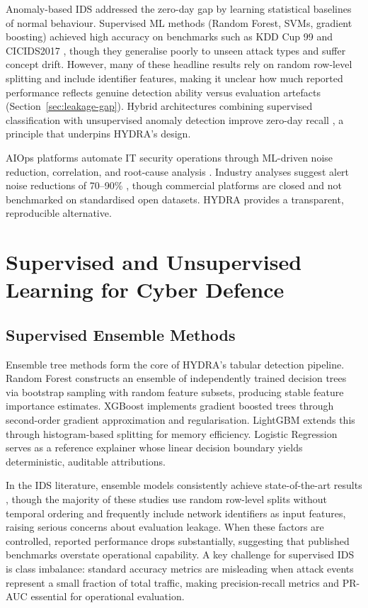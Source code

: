 \documentclass[12pt,a4paper]{report}
\begin{document}
Anomaly-based IDS addressed the zero-day gap by learning statistical baselines of normal behaviour. Supervised ML methods (Random Forest, SVMs, gradient boosting) achieved high accuracy on benchmarks such as KDD Cup 99 and CICIDS2017 \cite{aldweesh2020}, though they generalise poorly to unseen attack types and suffer concept drift. However, many of these headline results rely on random row-level splitting and include identifier features, making it unclear how much reported performance reflects genuine detection ability versus evaluation artefacts (Section~\ref{sec:leakage-gap}). Hybrid architectures combining supervised classification with unsupervised anomaly detection improve zero-day recall \cite{alsaedi2020}, a principle that underpins HYDRA's design.

AIOps platforms automate IT security operations through ML-driven noise reduction, correlation, and root-cause analysis \cite{dang2019}. Industry analyses suggest alert noise reductions of 70--90\% \cite{fortinet2025}, though commercial platforms are closed and not benchmarked on standardised open datasets. HYDRA provides a transparent, reproducible alternative.

\section{Supervised and Unsupervised Learning for Cyber Defence}
\label{sec:supervised}

\subsection{Supervised Ensemble Methods}
\label{sec:ensemble}

Ensemble tree methods form the core of HYDRA's tabular detection pipeline. Random Forest \cite{breiman2001} constructs an ensemble of independently trained decision trees via bootstrap sampling with random feature subsets, producing stable feature importance estimates. XGBoost \cite{chen2016} implements gradient boosted trees through second-order gradient approximation and regularisation. LightGBM \cite{ke2017} extends this through histogram-based splitting for memory efficiency. Logistic Regression serves as a reference explainer whose linear decision boundary yields deterministic, auditable attributions.

In the IDS literature, ensemble models consistently achieve state-of-the-art results \cite{shtayat2023,rani2024}, though the majority of these studies use random row-level splits without temporal ordering and frequently include network identifiers as input features, raising serious concerns about evaluation leakage. When these factors are controlled, reported performance drops substantially, suggesting that published benchmarks overstate operational capability. A key challenge for supervised IDS is class imbalance: standard accuracy metrics are misleading when attack events represent a small fraction of total traffic, making precision-recall metrics and PR-AUC essential for operational evaluation.
\end{document}
